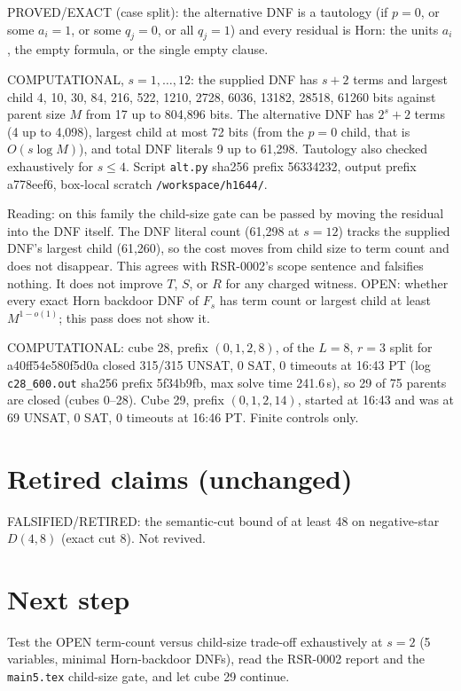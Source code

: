 \documentclass[11pt]{article}
\begin{document}
PROVED/EXACT (case split): the alternative DNF is a tautology (if $p=0$, or some $a_i=1$, or some $q_j=0$, or all $q_j=1$) and every residual is Horn: the units $a_i$, the empty formula, or the single empty clause.

COMPUTATIONAL, $s=1,\dots,12$: the supplied DNF has $s+2$ terms and largest child 4, 10, 30, 84, 216, 522, 1210, 2728, 6036, 13182, 28518, 61260 bits against parent size $M$ from 17 up to 804{,}896 bits. The alternative DNF has $2^s+2$ terms (4 up to 4{,}098), largest child at most 72 bits (from the $p{=}0$ child, that is $O(s\log M)$), and total DNF literals 9 up to 61{,}298. Tautology also checked exhaustively for $s\le 4$. Script \texttt{alt.py} sha256 prefix 56334232, output prefix a778eef6, box-local scratch \texttt{/workspace/h1644/}.

Reading: on this family the child-size gate can be passed by moving the residual into the DNF itself. The DNF literal count (61{,}298 at $s=12$) tracks the supplied DNF's largest child (61{,}260), so the cost moves from child size to term count and does not disappear. This agrees with RSR-0002's scope sentence and falsifies nothing. It does not improve $T$, $S$, or $R$ for any charged witness. OPEN: whether every exact Horn backdoor DNF of $F_s$ has term count or largest child at least $M^{1-o(1)}$; this pass does not show it.

COMPUTATIONAL: cube 28, prefix $(0,1,2,8)$, of the $L=8$, $r=3$ split for a40ff54e580f5d0a closed 315/315 UNSAT, 0 SAT, 0 timeouts at 16:43 PT (log \texttt{c28\_600.out} sha256 prefix 5f34b9fb, max solve time 241.6\,s), so 29 of 75 parents are closed (cubes 0--28). Cube 29, prefix $(0,1,2,14)$, started at 16:43 and was at 69 UNSAT, 0 SAT, 0 timeouts at 16:46 PT. Finite controls only.

\section*{Retired claims (unchanged)}
FALSIFIED/RETIRED: the semantic-cut bound of at least 48 on negative-star $D(4,8)$ (exact cut 8). Not revived.

\section*{Next step}
Test the OPEN term-count versus child-size trade-off exhaustively at $s=2$ (5 variables, minimal Horn-backdoor DNFs), read the RSR-0002 report and the \texttt{main5.tex} child-size gate, and let cube 29 continue.
\end{document}
